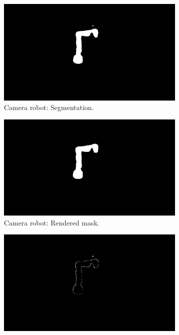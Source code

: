 \begin{figure}[tb]
    \centering
    \begin{subfigure}[b]{0.32\textwidth}
        \includegraphics[width=\textwidth]{chapter_1/img/hsi_left_mask_2.png}
        \caption{Camera robot: Segmentation.}
    \end{subfigure}
    \begin{subfigure}[b]{0.32\textwidth}
        \includegraphics[width=\textwidth]{chapter_1/img/hsi_left_render_mask_2.png}
        \caption{Camera robot: Rendered mask.}
    \end{subfigure}
    \begin{subfigure}[b]{0.32\textwidth}
        \includegraphics[width=\textwidth]{chapter_1/img/hsi_left_difference_2.png}

\end{subfigure}
\end{figure}
